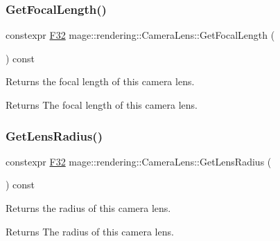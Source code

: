 \subsubsection{\texorpdfstring{Get\+Focal\+Length()}{GetFocalLength()}}
{\footnotesize\ttfamily constexpr \hyperlink{namespacemage_aa97e833b45f06d60a0a9c4fc22ae02c0}{F32} mage\+::rendering\+::\+Camera\+Lens\+::\+Get\+Focal\+Length (\begin{DoxyParamCaption}{ }\end{DoxyParamCaption}) const\hspace{0.3cm}{\ttfamily [noexcept]}}

Returns the focal length of this camera lens.

\begin{DoxyReturn}{Returns}
The focal length of this camera lens. 
\end{DoxyReturn}
\hypertarget{classmage_1_1rendering_1_1_camera_lens_a2cfbec82b5e74c9a481d53944ad6a508}{}\label{classmage_1_1rendering_1_1_camera_lens_a2cfbec82b5e74c9a481d53944ad6a508} 
\subsubsection{\texorpdfstring{Get\+Lens\+Radius()}{GetLensRadius()}}
{\footnotesize\ttfamily constexpr \hyperlink{namespacemage_aa97e833b45f06d60a0a9c4fc22ae02c0}{F32} mage\+::rendering\+::\+Camera\+Lens\+::\+Get\+Lens\+Radius (\begin{DoxyParamCaption}{ }\end{DoxyParamCaption}) const\hspace{0.3cm}{\ttfamily [noexcept]}}

Returns the radius of this camera lens.

\begin{DoxyReturn}{Returns}
The radius of this camera lens. 
\end{DoxyReturn}
\hypertarget{classmage_1_1rendering_1_1_camera_lens_aea9eeadbb33600a036a57e797776cbc6}{}\label{classmage_1_1rendering_1_1_camera_lens_aea9eeadbb33600a036a57e797776cbc6} 

